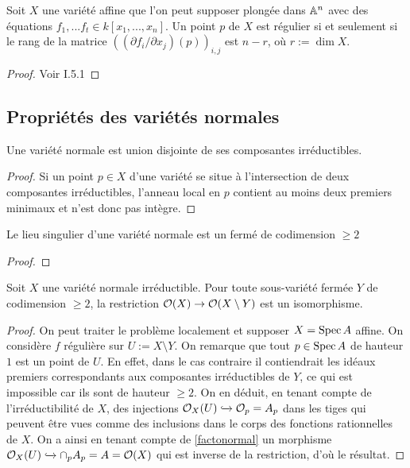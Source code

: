 \begin{prop}\label{CritereReg}
Soit $X$ une variété affine que l'on peut supposer plongée dans $\mathbb{A}^n$ avec des équations $f_1,...f_t\in k[x_1,...,x_n]$. Un point $p$ de $X$ est régulier si et seulement si le rang de la matrice $((\partial f_i/\partial x_j)(p))_{i,j}$ est $n-r$, où $r:=\dim X$.
\end{prop}
\begin{proof}
Voir \cite{Hartshorne} I.5.1
\end{proof}


\subsection{Propriétés des variétés normales}

\begin{prop}\label{normaluniondisjointe}
Une variété normale est union disjointe de ses composantes irréductibles.
\end{prop}
\begin{proof}
Si un point $p\in X$ d'une variété se situe à l'intersection de deux composantes irréductibles, l'anneau local en $p$ contient au moins deux premiers minimaux et n'est donc pas intègre.
\end{proof}

\begin{prop}\label{codimesingnormal}
Le lieu singulier d'une variété normale est un fermé de codimension $\geq 2$
\end{prop}
\begin{proof}

\end{proof}


\begin{prop}\label{extregularnormal}
Soit $X$ une variété normale irréductible. Pour toute sous-variété fermée $Y$ de codimension $\geq 2$, la restriction $\mathcal{O}(X)\rightarrow \mathcal{O}(X\setminus Y)$ est un isomorphisme.
\end{prop}
\begin{proof}
On peut traiter le problème localement et supposer $X=\operatorname{Spec} A$ affine. On considère $f$ régulière sur $U:=X\setminus Y$. On remarque que tout $p\in \operatorname{Spec} A$ de hauteur $1$ est un point de $U$. En effet, dans le cas contraire il contiendrait les idéaux premiers correspondants aux composantes irréductibles de $Y$, ce qui est impossible car ils sont de hauteur $\geq 2$. On en déduit, en tenant compte de l'irréductibilité de $X$, des injections $\mathcal{O}_X(U)\xhookrightarrow{} \mathcal{O}_p=A_p$ dans les tiges qui peuvent être vues comme des inclusions dans le corps des fonctions rationnelles de $X$. On a ainsi en tenant compte de \ref{factonormal} un morphisme $\mathcal{O}_X(U)\xhookrightarrow{} \cap_p A_p=A=\mathcal{O}(X)$ qui est inverse de la restriction, d'où le résultat.
\end{proof}

